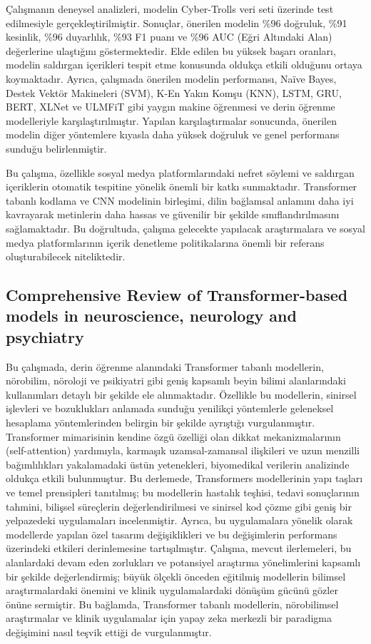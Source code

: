 \documentclass{article}
\begin{document}
Çalışmanın deneysel analizleri, modelin Cyber-Trolls veri seti üzerinde test edilmesiyle gerçekleştirilmiştir. Sonuçlar, önerilen modelin \%96 doğruluk, \%91 kesinlik, \%96 duyarlılık, \%93 F1 puanı ve \%96 AUC (Eğri Altındaki Alan) değerlerine ulaştığını göstermektedir. Elde edilen bu yüksek başarı oranları, modelin saldırgan içerikleri tespit etme konusunda oldukça etkili olduğunu ortaya koymaktadır. Ayrıca, çalışmada önerilen modelin performansı, Naïve Bayes, Destek Vektör Makineleri (SVM), K-En Yakın Komşu (KNN), LSTM, GRU, BERT, XLNet ve ULMFiT gibi yaygın makine öğrenmesi ve derin öğrenme modelleriyle karşılaştırılmıştır. Yapılan karşılaştırmalar sonucunda, önerilen modelin diğer yöntemlere kıyasla daha yüksek doğruluk ve genel performans sunduğu belirlenmiştir.  

Bu çalışma, özellikle sosyal medya platformlarındaki nefret söylemi ve saldırgan içeriklerin otomatik tespitine yönelik önemli bir katkı sunmaktadır. Transformer tabanlı kodlama ve CNN modelinin birleşimi, dilin bağlamsal anlamını daha iyi kavrayarak metinlerin daha hassas ve güvenilir bir şekilde sınıflandırılmasını sağlamaktadır. Bu doğrultuda, çalışma gelecekte yapılacak araştırmalara ve sosyal medya platformlarının içerik denetleme politikalarına önemli bir referans oluşturabilecek niteliktedir.

\subsection{ Comprehensive Review of Transformer-based models in
 neuroscience, neurology and psychiatry}

Bu çalışmada\cite{cong2024transformer}, derin öğrenme alanındaki Transformer tabanlı modellerin, nörobilim, nöroloji ve psikiyatri gibi geniş kapsamlı beyin bilimi alanlarındaki kullanımları detaylı bir şekilde ele alınmaktadır. Özellikle bu modellerin, sinirsel işlevleri ve bozuklukları anlamada sunduğu yenilikçi yöntemlerle geleneksel hesaplama yöntemlerinden belirgin bir şekilde ayrıştığı vurgulanmıştır. Transformer mimarisinin kendine özgü özelliği olan dikkat mekanizmalarının (self-attention) yardımıyla, karmaşık uzamsal-zamansal ilişkileri ve uzun menzilli bağımlılıkları yakalamadaki üstün yetenekleri, biyomedikal verilerin analizinde oldukça etkili bulunmuştur. Bu derlemede, Transformers modellerinin yapı taşları ve temel prensipleri tanıtılmış; bu modellerin hastalık teşhisi, tedavi sonuçlarının tahmini, bilişsel süreçlerin değerlendirilmesi ve sinirsel kod çözme gibi geniş bir yelpazedeki uygulamaları incelenmiştir. Ayrıca, bu uygulamalara yönelik olarak modellerde yapılan özel tasarım değişiklikleri ve bu değişimlerin performans üzerindeki etkileri derinlemesine tartışılmıştır. Çalışma, mevcut ilerlemeleri, bu alanlardaki devam eden zorlukları ve potansiyel araştırma yönelimlerini kapsamlı bir şekilde değerlendirmiş; büyük ölçekli önceden eğitilmiş modellerin bilimsel araştırmalardaki önemini ve klinik uygulamalardaki dönüşüm gücünü gözler önüne sermiştir. Bu bağlamda, Transformer tabanlı modellerin, nörobilimsel araştırmalar ve klinik uygulamalar için yapay zeka merkezli bir paradigma değişimini nasıl teşvik ettiği de vurgulanmıştır.
\end{document}
